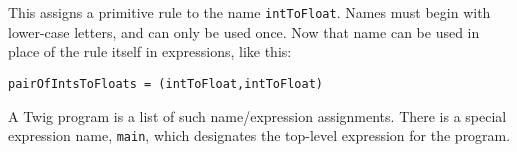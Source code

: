This assigns a primitive rule to the name \texttt{intToFloat}. Names must begin with lower-case letters, and can only be used once. Now that name can be used in place of the rule itself in expressions, like this:

\begin{verbatim}
pairOfIntsToFloats = (intToFloat,intToFloat)
\end{verbatim}

A Twig program is a list of such name/expression assignments. There is a special expression name, \texttt{main}, which designates the top-level expression for the program.

% 
% 
